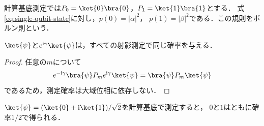 計算基底測定では$P_0=\ket{0}\bra{0}$，$P_1=\ket{1}\bra{1}$とする．
式\eqref{eq:single-qubit-state}に対し，$p(0)=|\alpha|^2$，
$p(1)=|\beta|^2$である．この規則をボルン則という．

\begin{prop}
$\ket{\psi}$と$e^{\mathrm{i}\gamma}\ket{\psi}$は，すべての射影測定で同じ確率を与える．
\end{prop}
\begin{proof}
任意の$m$について
\[
  e^{-\mathrm{i}\gamma}\bra{\psi}P_m
  e^{\mathrm{i}\gamma}\ket{\psi}
  =\bra{\psi}P_m\ket{\psi}
\]
であるため，測定確率は大域位相に依存しない．
\end{proof}

\begin{ex}
$\ket{\psi}=(\ket{0}+\mathrm{i}\ket{1})/\sqrt2$を計算基底で測定すると，
$0$と$1$はともに確率$1/2$で得られる．
\end{ex}

